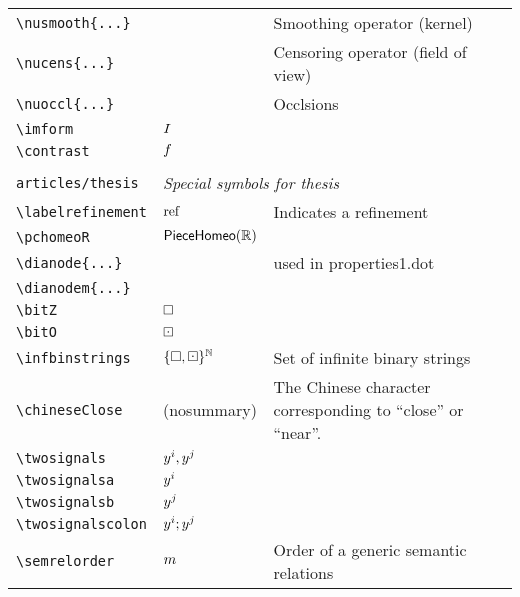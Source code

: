 \begin{longtable}{lll}
 {\color[rgb]{0.5,0.5,0.5}\texttt{\textbackslash nusmooth\{...\}}} &  &  Smoothing operator (kernel)\\ 
 {\color[rgb]{0.5,0.5,0.5}\texttt{\textbackslash nucens\{...\}}} &  &  Censoring operator (field of view)\\ 
 {\color[rgb]{0.5,0.5,0.5}\texttt{\textbackslash nuoccl\{...\}}} &  &  Occlsions\\ 
 {\color[rgb]{0.5,0.5,0.5}\texttt{\textbackslash imform}} & $I$ & \\ 
 {\color[rgb]{0.5,0.5,0.5}\texttt{\textbackslash contrast}} & $f$ & \\ 
  &  & \\ 
 {\color[rgb]{0.5,0.5,0.5}\texttt{articles/thesis}} & \multicolumn{2}{l}{\emph{Special symbols for thesis}}\\ 
 \hline
{\color[rgb]{0.5,0.5,0.5}\texttt{\textbackslash labelrefinement}} & $\text{ref}$ &  Indicates a refinement\\ 
 {\color[rgb]{0.5,0.5,0.5}\texttt{\textbackslash pchomeoR}} & $\mathsf{PieceHomeo}(\mathbb{R})$ & \\ 
 {\color[rgb]{0.5,0.5,0.5}\texttt{\textbackslash dianode\{...\}}} &  &  used in properties1.dot\\ 
 {\color[rgb]{0.5,0.5,0.5}\texttt{\textbackslash dianodem\{...\}}} &  & \\ 
 {\color[rgb]{0.5,0.5,0.5}\texttt{\textbackslash bitZ}} & $\square$ & \\ 
 {\color[rgb]{0.5,0.5,0.5}\texttt{\textbackslash bitO}} & $\boxdot$ & \\ 
 {\color[rgb]{0.5,0.5,0.5}\texttt{\textbackslash infbinstrings}} & ${\{\square,\boxdot\}^\mathbb{N}}$ &  Set of infinite binary strings\\ 
 {\color[rgb]{0.5,0.5,0.5}\texttt{\textbackslash chineseClose}} & (nosummary) &  The Chinese character corresponding to ``close'' or ``near''. \\ 
 {\color[rgb]{0.5,0.5,0.5}\texttt{\textbackslash twosignals}} & $y^i,y^j$ & \\ 
 {\color[rgb]{0.5,0.5,0.5}\texttt{\textbackslash twosignalsa}} & $y^i$ & \\ 
 {\color[rgb]{0.5,0.5,0.5}\texttt{\textbackslash twosignalsb}} & $y^j$ & \\ 
 {\color[rgb]{0.5,0.5,0.5}\texttt{\textbackslash twosignalscolon}} & $y^i;y^j$ & \\ 
 {\color[rgb]{0.5,0.5,0.5}\texttt{\textbackslash semrelorder}} & $m$ &  Order of a generic semantic relations\\ 

\end{longtable}
